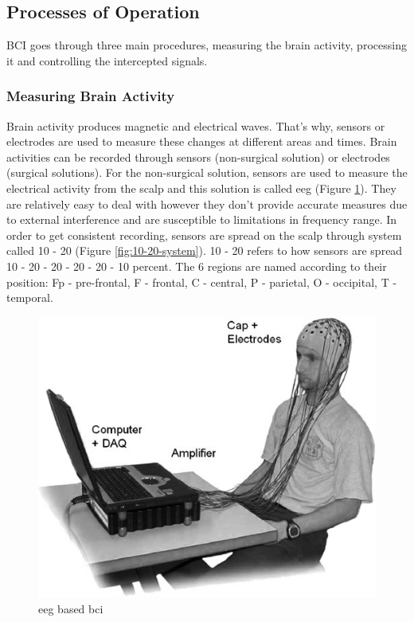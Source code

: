 \subsection{Processes of Operation}
BCI goes through three main procedures, measuring the brain activity, processing it and controlling the intercepted signals.\par
\subsubsection{Measuring Brain Activity}
Brain activity produces magnetic and electrical waves. That’s why, sensors or electrodes are used to measure these changes at different areas and times. Brain activities can be recorded through sensors (non-surgical solution) or electrodes (surgical solutions). For the non-surgical solution, sensors are used to measure the electrical activity from the scalp and this solution is called \ac{eeg} (Figure \ref{fig:eeg}). They are relatively easy to deal with however they don’t provide accurate measures due to external interference and are susceptible to limitations in frequency range. In order to get consistent recording, sensors are spread on the scalp through system called 10 - 20 (Figure \ref{fig:10-20-system}). 10 - 20 refers to how sensors are spread 10 - 20 - 20 - 20 - 20 - 10 percent. The 6 regions are named according to their position: Fp - pre-frontal, F - frontal, C - central, P - parietal, O - occipital, T - temporal.\par
\begin{figure}
    \centering
    \includegraphics[width=\figureWidth]{images/background/eeg.jpg}
    \caption{\ac{eeg} based \ac{bci} \cite{inbook1}}
    \label{fig:eeg}
\end{figure}

